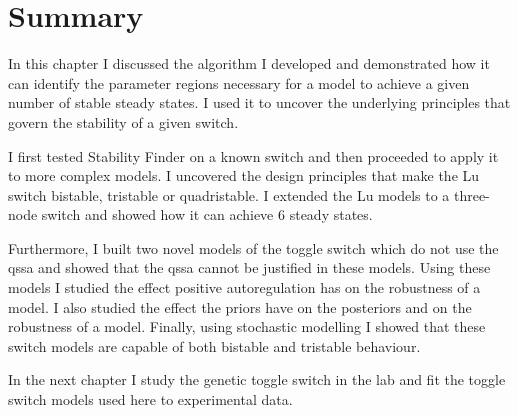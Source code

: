 \section{Summary}

In this chapter I discussed the algorithm I developed and demonstrated how it can identify the parameter regions necessary for a model to achieve a given number of stable steady states. I used it to uncover the underlying principles that govern the stability of a given switch. 

I first tested Stability Finder on a known switch and then proceeded to apply it to more complex models. I uncovered the design principles that make the Lu switch bistable, tristable or quadristable. I extended the Lu models to a three-node switch and showed how it can achieve 6 steady states. 

Furthermore, I built two novel models of the toggle switch which do not use the \acrshort{qssa} and showed that the \acrshort{qssa} cannot be justified in these models. Using these models I studied the effect positive autoregulation has on the robustness of a model. I also studied the effect the priors have on the posteriors and on the robustness of a model. Finally, using stochastic modelling I showed that these switch models are capable of both bistable and tristable behaviour. 

In the next chapter I study the genetic toggle switch in the lab and fit the toggle switch models used here to experimental data. 




